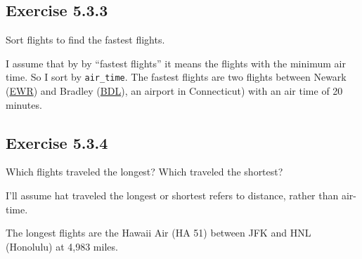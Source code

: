 \documentclass[]{book}
\newenvironment{Shaded}{\begin{snugshade}}{\end{snugshade}}
\newcommand{\CommentTok}[1]{\textcolor[rgb]{0.56,0.35,0.01}{\textit{#1}}}
\newcommand{\KeywordTok}[1]{\textcolor[rgb]{0.13,0.29,0.53}{\textbf{#1}}}
\newcommand{\NormalTok}[1]{#1}
\newcommand{\OperatorTok}[1]{\textcolor[rgb]{0.81,0.36,0.00}{\textbf{#1}}}
\newcommand{\StringTok}[1]{\textcolor[rgb]{0.31,0.60,0.02}{#1}}
\theoremstyle{plain}
\theoremstyle{remark}
\theoremstyle{definition}
\theoremstyle{definition}
\theoremstyle{definition}
\theoremstyle{remark}
\begin{document}
\hypertarget{exercise-5.3.3}{%
\subsection*{\texorpdfstring{Exercise
{5.3.3}}{Exercise 5.3.3}}\label{exercise-5.3.3}}

Sort flights to find the fastest flights.

I assume that by by ``fastest flights'' it means the flights with the
minimum air time. So I sort by \texttt{air\_time}. The fastest flights
are two flights between Newark
(\href{https://en.wikipedia.org/wiki/Newark_Liberty_International_Airport}{EWR})
and Bradley
(\href{https://en.wikipedia.org/wiki/Bradley_International_Airport}{BDL}),
an airport in Connecticut) with an air time of 20 minutes.

\begin{Shaded}
\end{Shaded}

\hypertarget{exercise-5.3.4}{%
\subsection*{\texorpdfstring{Exercise
{5.3.4}}{Exercise 5.3.4}}\label{exercise-5.3.4}}

Which flights traveled the longest? Which traveled the shortest?

I'll assume hat traveled the longest or shortest refers to distance,
rather than air-time.

The longest flights are the Hawaii Air (HA 51) between JFK and HNL
(Honolulu) at 4,983 miles.
\end{document}
